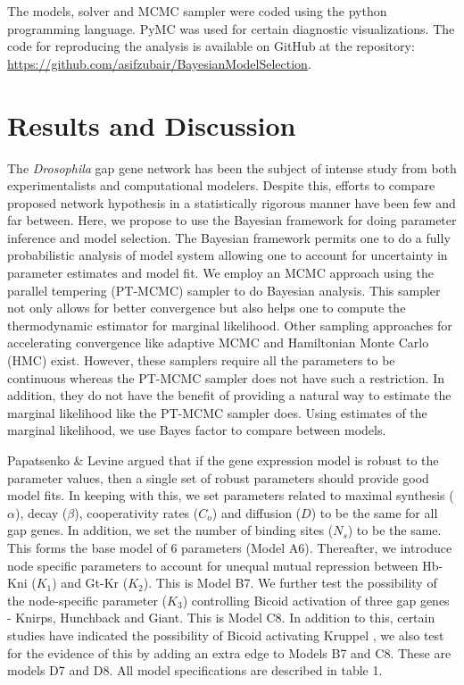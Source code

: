 The models, solver and MCMC sampler were coded using the python programming language. PyMC \cite{patil10} was used for certain diagnostic visualizations. The code for reproducing the analysis is available on GitHub at the repository:\\ \href{https://github.com/asifzubair/BayesianModelSelection}{https://github.com/asifzubair/BayesianModelSelection}. 

\section{Results and Discussion}

The \textit{Drosophila} gap gene network has been the subject of intense study from both experimentalists and computational modelers. Despite this, efforts to compare proposed network hypothesis in a statistically rigorous manner have been few and far between. Here, we propose to use the Bayesian framework for doing parameter inference and model selection. The Bayesian framework permits one to do a fully probabilistic analysis of model system allowing one to account for uncertainty in parameter estimates and model fit. We employ an MCMC approach using the parallel tempering (PT-MCMC) sampler to do Bayesian analysis. This sampler not only allows for better convergence but also helps one to compute the thermodynamic estimator for marginal likelihood. Other sampling approaches for accelerating convergence like adaptive MCMC \cite{Andrieu2008} and Hamiltonian Monte Carlo (HMC) \cite{Betancourt_A_2017} exist. However, these samplers require all the parameters to be continuous whereas the PT-MCMC sampler does not have such a restriction. In addition, they do not have the benefit of providing a natural way to estimate the marginal likelihood like the PT-MCMC sampler does. Using estimates of the marginal likelihood, we use Bayes factor to compare between models. 

Papatsenko \& Levine  argued that if the gene expression model is robust to the parameter values, then a single set of robust parameters should provide good model fits. In keeping with this, we set parameters related to maximal synthesis ($\alpha$),  decay ($\beta$), cooperativity rates ($C_o$) and diffusion ($D$) to be the same for all gap genes. In addition, we set the number of binding sites ($N_s$) to be the same. This forms the base model of 6 parameters (Model A6). Thereafter, we introduce node specific parameters to account for unequal mutual repression between Hb-Kni ($K_1$) and Gt-Kr ($K_2$). This is Model B7. We further test the possibility of the node-specific parameter ($K_3$) controlling Bicoid activation of three gap genes - Knirps, Hunchback and Giant. This is Model C8. In addition to this, certain studies have indicated the possibility of Bicoid activating Kruppel {\cite{knipple85, Becker13}, we also test for the evidence of this} by adding an extra edge to Models B7 and C8. These are models D7 and D8. All model specifications are described in table 1.

